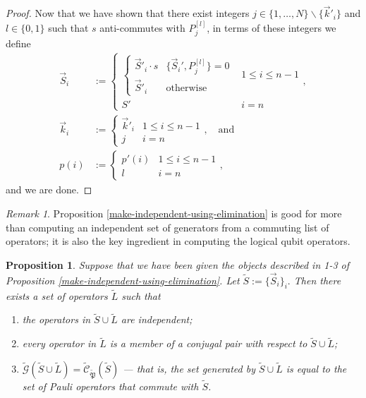 \documentclass{amsbook}
\theoremstyle{plain}
\newtheorem{proposition}{Proposition}
\theoremstyle{definition}
\theoremstyle{remark}
\newtheorem{remark}{Remark}
\newcommand{\lst}{\vec}
\newcommand{\set}{\tilde}
\newcommand{\genfun}{\tilde{\mathcal{G}}}
\newcommand{\pauligroup}{{\set{\mathfrak{P}}}}
\newcommand{\centralizer}{\set{\mathcal{C}}}
\newcommand{\paren}[1]{\left(#1\right)}
\begin{document}
\begin{proof}
Now that we have shown that there exist integers $j\in\{1,\dots,N\}\backslash\{\lst k'_i\}$ and $l\in\{0,1\}$ such that $s$ anti-commutes with $P_{j}^{[l]}$, in terms of these integers we define
$$
\begin{aligned}
\lst S_i &:= 
\begin{cases}
\begin{cases}
\lst S'_i \cdot s & \{\lst S_i',P_j^{[l]}\}=0 \\
\lst S'_i & \text{otherwise}
\end{cases} & 1\le i\le n-1 \\
S' & i=n
\end{cases}, \\
\lst k_i &:=
\begin{cases}
\lst k'_i & 1 \le i \le n-1 \\
j & i=n
\end{cases},\quad \text{and} \\
p(i) &:=
\begin{cases}
p'(i) & 1 \le i \le n-1\\
l & i=n
\end{cases},
\end{aligned}
$$ and we are done.
\end{proof}
\begin{remark}
Proposition \ref{make-independent-using-elimination} is good for more than computing an independent set of generators from a commuting list of operators;  it is also the key ingredient in computing the logical qubit operators.
\end{remark}

\begin{proposition}
\label{construction-of-logicals}
Suppose that we have been given the objects described in 1-3 of Proposition \ref{make-independent-using-elimination}.  Let $\set S := \{\vec S_i\}_i.$  Then there exists a set of operators $\set L$ such that
\begin{enumerate}
\item \label{L-are-independent} the operators in $\set S\cup\set L$ are independent;
\item \label{L-are-conjugal-pairs} every operator in $\set L$ is a member of a conjugal pair with respect to $\set S\cup\set L$;
\item \label{L-completes-the-generators} $\genfun\paren{\set S\cup\set L}=\centralizer_\pauligroup(\set S)$ --- that is, the set generated by $\set S\cup\set L$ is equal to the set of Pauli operators that commute with $\set S$.
\end{enumerate}
\end{proposition}
\end{document}
